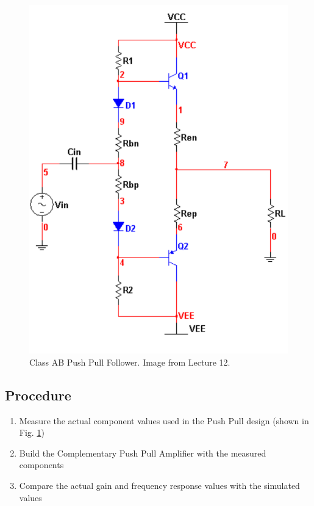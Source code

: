 \documentclass[12pt,letterpaper]{report}
\newlength \figwidth
\begin{document}
\begin{figure}[H]
\centering
\includegraphics[width=\figwidth, keepaspectratio=true]{lab7_images/push_pull.png}
\caption{Class AB Push Pull Follower. Image from Lecture 12.}
\label{fig:push_pull}
\end{figure}

\subsection*{Procedure}

\begin{enumerate}
\item Measure the actual component values used in the Push Pull design (shown in Fig. \ref{fig:push_pull})
\item Build the Complementary Push Pull Amplifier with the measured components
\item Compare the actual gain and frequency response values with the simulated values
\end{enumerate}
\end{document}
